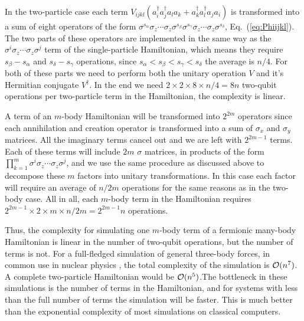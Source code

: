 \documentclass[aps,pra,twocolumn,floatfix]{revtex4}
\begin{document}
In the two-particle case each term $V_{ijkl}(a^\dag_i a^\dag_j a_l a_k
+ a^\dag_k a^\dag_l a_j a_i)$ is transformed into a sum of eight
operators of the form $\sigma^{s_\alpha} \sigma_z \cdots \sigma_z
\sigma^{s_\beta} \sigma^{s_\gamma} \sigma_z \cdots \sigma_z
\sigma^{s_\delta}$, Eq.~(\ref{eq:Phiijkl}). The two parts of these
operators are implemented in the same way as the $\sigma^i
\sigma_z\cdots \sigma_z \sigma^j$ term of the single-particle
Hamiltonian, which means they require $s_\beta - s_\alpha$  and
$s_\delta -s_\gamma$ operations, since
$s_\alpha<s_\beta<s_\gamma<s_\delta$  the average is $n/4$. 
For both of these parts we need to perform both the unitary operation
$V$ and it's
Hermitian conjugate $V^\dag$. In the end we need $2\times 2
\times 8 \times n/4=8n$ two-qubit operations per two-particle term in
the Hamiltonian, the complexity is linear.

A term of an $m$-body Hamiltonian will be transformed into $2^{2m}$
operators since each annihilation and creation operator is transformed
into a sum of $\sigma_x$ and $\sigma_y$ matrices. 
All the imaginary terms cancel out and we are left with $2^{2m-1}$
terms. 
Each of these terms
will include $2m$ $\sigma$ matrices, in products of the form
$\prod_{k=1}^m \sigma^i \sigma_z \cdots \sigma_z \sigma^j$,
and we use the same procedure as discussed above 
to decompose these $m$  factors into
unitary 
transformations. In this case each factor will require an average of
$n/2m$ operations for the same reasons as in the two-body case. 
All in all, each $m$-body term in the Hamiltonian requires
$2^{2m-1}\times 2\times m \times n/2m = 2^{2m-1}n$ operations.

Thus, the complexity for simulating one $m$-body term of a fermionic
many-body  Hamiltonian is linear in the number of two-qubit
operations, but the number of terms is  not. For a
full-fledged simulation of general three-body forces, in common use in
nuclear physics \cite{Pieper2001,navratil2002,ccsdt03}, 
the total complexity of the simulation is ${\cal O}
(n^7)$.  A complete two-particle Hamiltonian would be ${\cal O}
(n^5)$.The bottleneck in these simulations is the number of terms in the
Hamiltonian, and for systems with less than the full number of terms
the simulation will be faster.
This is much better than the exponential complexity of
most simulations on classical computers.%
\end{document}
